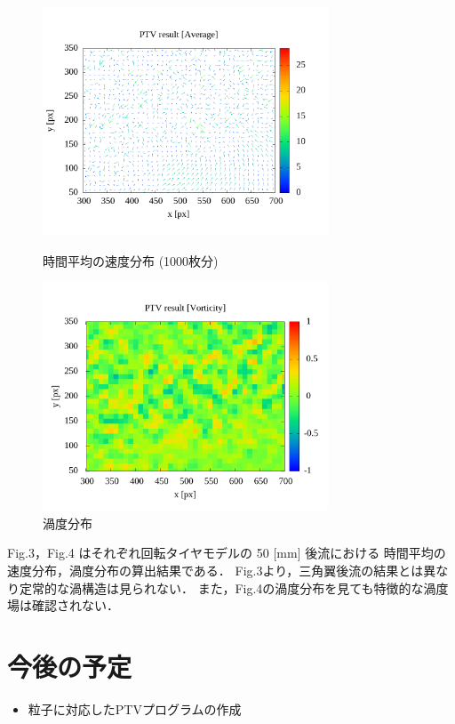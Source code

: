 \documentclass[twocolumn,a4j]{jsarticle}
\begin{document}
\begin{figure}[htbp]
  \footnotesize
  \begin{center}
    \includegraphics[width=85mm]{../images/rolling_ave.png}
    \caption{時間平均の速度分布 (1000枚分)}
    \includegraphics[width=85mm]{../images/rolling_vor.png}
    \caption{渦度分布}
  \end{center}
\end{figure}

Fig.3，Fig.4 はそれぞれ回転タイヤモデルの 50 [mm] 後流における
時間平均の速度分布，渦度分布の算出結果である．
Fig.3より，三角翼後流の結果とは異なり定常的な渦構造は見られない．
また，Fig.4の渦度分布を見ても特徴的な渦度場は確認されない．

\newpage
\section{今後の予定}
\begin{itemize}
  \item 粒子に対応したPTVプログラムの作成
\end{itemize}
\end{document}
